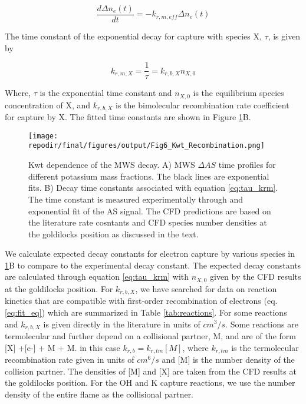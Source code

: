 \begin{equation}
    \label{eq:fit_eq}
    \frac{d\Delta n_e (t)}{dt} = - k_{r, m, eff} \Delta n_e (t) 
\end{equation}

The time constant of the exponential decay for capture with species X, $\tau$, is given by

\begin{equation}
    \label{eq:tau_krm}
    k_{r, m, X} = \frac{1}{\tau} = k_{r, b, X}n_{X,0}
\end{equation}

Where, $\tau$ is the exponential time constant and $n_{X,0}$ is the equilibrium species concentration of X, and $k_{r, b, X}$ is the bimolecular recombination rate coefficient for capture by X. The fitted time constants are shown in Figure \ref{fig:kwt_recombination}B.


\begin{figure}[h]
    \texttt{[image: \\repodir/final/figures/output/Fig6\_Kwt\_Recombination.png]} 
    \centering
    \caption{Kwt dependence of the MWS decay. A) MWS $\Delta AS$ time profiles for different potassium mass fractions. The black lines are exponential fits. B) Decay time constants associated with equation \ref{eq:tau_krm}. The time constant is measured experimentally through and exponential fit of the AS signal. The CFD predictions are based on the literature rate cosntants and CFD species number densities at the goldilocks position as discussed in the text.  }
    \label{fig:kwt_recombination}
\end{figure}



We calculate expected decay constants for electron capture by various species in \ref{fig:kwt_recombination}B to compare to the experimental decay constant. The expected decay constants are calculated through equation \ref{eq:tau_krm} with $n_{X,0}$ given by the CFD results at the goldilocks position. For $k_{r,b,X}$, we have searched for data on reaction kinetics that are compatible with first-order recombination of electrons (eq. \ref{eq:fit_eq}) which are summarized in Table \ref{tab:reactions}. For some reactions and $k_{r,b,X}$ is given directly in the literature in units of $cm^3/s$. Some reactions are termolecular and further depend on a collisional partner, M, and are of the form [X] +[e-] + M \rightarrow [X-] + M. in this case $k_{r,b} = k_{r,tm} [M]$, where $k_{r,tm}$ is the termolecular recombination rate given in units of $cm^6/s$ and [M] is the number density of the collision partner.  The densities of [M] and [X] are taken from the CFD results at the goldilocks position. For the OH and K capture reactions, we use the number density of the entire flame as the collisional partner. 


